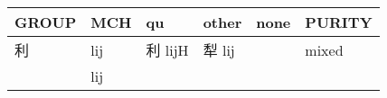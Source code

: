 \documentclass[14pt,a4paper]{scrartcl}
\begin{document}
\begin{longtable}[c]{@{}llllll@{}}
\toprule
\begin{minipage}[b]{0.14\columnwidth}\raggedright\strut
GROUP
\strut\end{minipage} &
\begin{minipage}[b]{0.14\columnwidth}\raggedright\strut
MCH
\strut\end{minipage} &
\begin{minipage}[b]{0.14\columnwidth}\raggedright\strut
qu
\strut\end{minipage} &
\begin{minipage}[b]{0.14\columnwidth}\raggedright\strut
other
\strut\end{minipage} &
\begin{minipage}[b]{0.14\columnwidth}\raggedright\strut
none
\strut\end{minipage} &
\begin{minipage}[b]{0.14\columnwidth}\raggedright\strut
PURITY
\strut\end{minipage}\tabularnewline
\midrule
\endhead
\begin{minipage}[t]{0.14\columnwidth}\raggedright\strut
利
\strut\end{minipage} &
\begin{minipage}[t]{0.14\columnwidth}\raggedright\strut
lij
\strut\end{minipage} &
\begin{minipage}[t]{0.14\columnwidth}\raggedright\strut
利 lijH
\strut\end{minipage} &
\begin{minipage}[t]{0.14\columnwidth}\raggedright\strut
犁 lij
\strut\end{minipage} &
\begin{minipage}[t]{0.14\columnwidth}\raggedright\strut
\strut\end{minipage} &
\begin{minipage}[t]{0.14\columnwidth}\raggedright\strut
mixed
\strut\end{minipage}\tabularnewline
\begin{minipage}[t]{0.14\columnwidth}\raggedright\strut
𥝢
\strut\end{minipage} &
\begin{minipage}[t]{0.14\columnwidth}\raggedright\strut
lij
\strut\end{minipage} &
\begin{minipage}[t]{0.14\columnwidth}\raggedright\strut
\strut\end{minipage} &
\begin{minipage}[t]{0.14\columnwidth}\raggedright\strut

\end{minipage}
\end{longtable}
\end{document}
